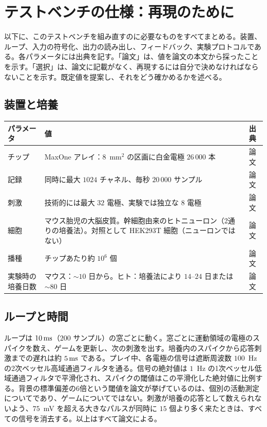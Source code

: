 \section{テストベンチの仕様：再現のために}
\label{sec:dishspec}

以下に、このテストベンチを組み直すのに必要なものをすべてまとめる。装置、ループ、入力の符号化、出力の読み出し、フィードバック、実験プロトコルである。各パラメータには出典を記す。「論文」は、値を論文\cite{Kagan2022}の本文から採ったことを示す。「選択」は、論文に記載がなく、再現するには自分で決めなければならないことを示す。既定値を提案し、それをどう確かめるかを述べる。

\subsection*{装置と培養}

\begin{center}
\footnotesize
\setlength{\tabcolsep}{4pt}
\renewcommand{\arraystretch}{1.15}
\begin{tabular}{>{\raggedright}p{4.0cm}>{\raggedright}p{6.9cm}>{\raggedright\arraybackslash}p{1.6cm}}
\toprule
パラメータ & 値 & 出典 \\
\midrule
チップ & MaxOne アレイ：$8$~mm$^2$ の区画に白金電極 $26\,000$ 本 & 論文 \\
記録 & 同時に最大 $1024$ チャネル、毎秒 $20\,000$ サンプル & 論文 \\
刺激 & 技術的には最大 $32$ 電極、実験では独立な $8$ 電極 & 論文 \\
細胞 & マウス胎児の大脳皮質。幹細胞由来のヒトニューロン（2通りの培養法）。対照として HEK293T 細胞（ニューロンではない） & 論文 \\
播種 & チップあたり約 $10^6$ 個 & 論文 \\
実験時の培養日数 & マウス：$\sim10$ 日から。ヒト：培養法により $14$--$24$ 日または $\sim80$ 日 & 論文 \\
\bottomrule
\end{tabular}
\end{center}

\subsection*{ループと時間}

ループは $10\,\text{ms}$（$200$ サンプル）の窓ごとに動く。窓ごとに運動領域の電極のスパイクを数え、ゲームを更新し、次の刺激を出す。培養内のスパイクから応答刺激までの遅れは約 $5\,\text{ms}$ である。プレイ中、各電極の信号は遮断周波数 $100$~Hz の2次ベッセル高域通過フィルタを通る。信号の絶対値は $1$~Hz の1次ベッセル低域通過フィルタで平滑化され、スパイクの閾値はこの平滑化した絶対値に比例する。背景の標準偏差の6倍という閾値を論文が挙げているのは、個別の活動測定についてであり、ゲームについてではない。刺激が培養の応答として数えられないよう、$75$~mV を超える大きなパルスが同時に $15$ 個より多く来たときは、すべての信号を消去する。以上はすべて論文による。

